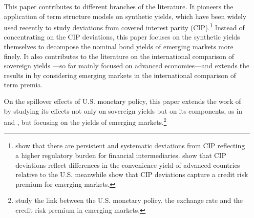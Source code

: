 {This paper contributes to different branches of the literature. 
It pioneers the application of term structure models on synthetic yields, which
have been widely used recently to study deviations from covered interest parity (CIP).\footnote{ \cite*{DuTepperVerdelhan:2018} show that there are persistent and systematic deviations from CIP reflecting a higher regulatory burden for financial intermediaries. 
	\cite*{DuImSchreger:2018JIE} show that CIP deviations reflect differences in the convenience yield of advanced countries relative to the U.S.
	\cite{DuSchreger:2016JoF} meanwhile show that CIP deviations capture a credit risk premium for emerging markets.}
Instead of concentrating on the CIP deviations, this paper focuses on the synthetic yields themselves to decompose the nominal bond yields of emerging markets more finely.
It also contributes to the literature on the international comparison of sovereign yields \citep{DahlquistHasseltoft:2016}---so far mainly focused on advanced economies---and extends the results in \cite{Wright:2011} by considering emerging markets in the international comparison of term premia.

On the spillover effects of U.S. monetary policy, this paper extends the work of \citet*{GilchristYueZakrajsek:2019} by studying its effects not only on sovereign yields but on its components, as in \cite*{CurcuruKaminLiRodriguez:2018} and \cite*{ACDM:2019}, but focusing on the yields of emerging markets.\footnote{ \cite*{HofmannShimShin:2019} study the link between the U.S. monetary policy, the exchange rate and the credit risk premium in emerging markets.}

}
